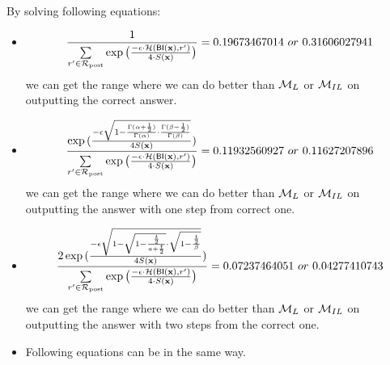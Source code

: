 \documentclass{article}
\begin{document}
By solving following equations:
\begin{itemize}
  \item
\[
\frac{1}{\sum\limits_{r'\in \mathcal{R}_{\textup{post}}} \exp \big(\frac{-\epsilon\cdot \mathcal{H} (\mathsf{BI}(\textbf{x}),r')}{4 \cdot S(\textbf{x})}\big)} = 0.19673467014\ or\ 0.31606027941
\]
we can get the range where we can do better than $\mathcal{M}_L$ or $\mathcal{M}_{IL}$ on outputting the correct answer.

  \item 
\[
\frac{\exp{(\frac{- \epsilon \sqrt{1 - \frac{\Gamma(\alpha+\frac{1}{2})}{\Gamma(\alpha)} \cdot
 \frac{\Gamma(\beta - \frac{1}{2})}{\Gamma(\beta)}}}{4 S(\textbf{x})})}}{\sum\limits_{r'\in \mathcal{R}_{\textup{post}}} \exp \big(\frac{-\epsilon\cdot \mathcal{H} (\mathsf{BI}(\textbf{x}),r')}{4 \cdot S(\textbf{x})}\big)}
 = 0.11932560927\ or\ 0.11627207896
\]
we can get the range where we can do better than $\mathcal{M}_L$ or $\mathcal{M}_{IL}$ on outputting the answer with one step from correct one.

  \item 
\[
\frac{2 \exp{(\frac{- \epsilon \sqrt{1 - 
    \sqrt{1 - \frac{\frac{t}{2}}{a + \frac{t}{2}}}
    \cdot
    \sqrt{1 - \frac{\frac{t}{2}}{\beta}}}}
    {4 S(\textbf{x})})}}{\sum\limits_{r'\in \mathcal{R}_{\textup{post}}} \exp \big(\frac{-\epsilon\cdot \mathcal{H} (\mathsf{BI}(\textbf{x}),r')}{4 \cdot S(\textbf{x})}\big)}
     = 0.07237464051\ or\ 0.04277410743
\]
we can get the range where we can do better than $\mathcal{M}_L$ or $\mathcal{M}_{IL}$ on outputting the answer with two steps from the correct one.

  \item Following equations can be in the same way.
\end{itemize}








\end{document}
